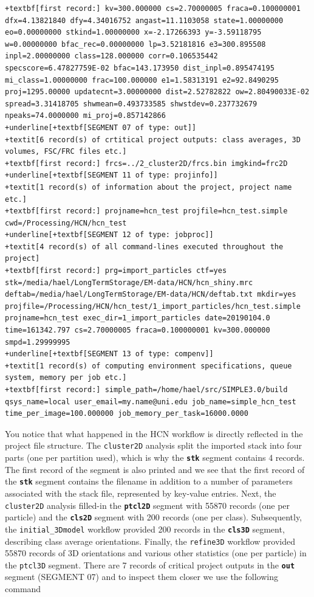 \documentclass[a4paper,11pt]{article}
\newcommand{\prgname}[1]{\textcolor{NavyBlue}{\texttt{#1}}}
\begin{document}
\begin{Verbatim}[commandchars=+\[\],fontsize=\small,breaklines=true]
+textbf[first record:] kv=300.000000 cs=2.70000005 fraca=0.100000001 dfx=4.13821840 dfy=4.34016752 angast=11.1103058 state=1.00000000 eo=0.00000000 stkind=1.00000000 x=-2.17266393 y=-3.59118795 w=0.00000000 bfac_rec=0.00000000 lp=3.52181816 e3=300.895508 inpl=2.00000000 class=128.000000 corr=0.106535442 specscore=6.47827759E-02 bfac=143.173950 dist_inpl=0.895474195 mi_class=1.00000000 frac=100.000000 e1=1.58313191 e2=92.8490295 proj=1295.00000 updatecnt=3.00000000 dist=2.52782822 ow=2.80490033E-02 spread=3.31418705 shwmean=0.493733585 shwstdev=0.237732679 npeaks=74.0000000 mi_proj=0.857142866
+underline[+textbf[SEGMENT 07 of type: out]]
+textit[6 record(s) of crtitical project outputs: class averages, 3D volumes, FSC/FRC files etc.]
+textbf[first record:] frcs=../2_cluster2D/frcs.bin imgkind=frc2D
+underline[+textbf[SEGMENT 11 of type: projinfo]]
+textit[1 record(s) of information about the project, project name etc.]
+textbf[first record:] projname=hcn_test projfile=hcn_test.simple cwd=/Processing/HCN/hcn_test
+underline[+textbf[SEGMENT 12 of type: jobproc]]
+textit[4 record(s) of all command-lines executed throughout the project]
+textbf[first record:] prg=import_particles ctf=yes stk=/media/hael/LongTermStorage/EM-data/HCN/hcn_shiny.mrc deftab=/media/hael/LongTermStorage/EM-data/HCN/deftab.txt mkdir=yes projfile=/Processing/HCN/hcn_test/1_import_particles/hcn_test.simple projname=hcn_test exec_dir=1_import_particles date=20190104.0 time=161342.797 cs=2.70000005 fraca=0.100000001 kv=300.000000 smpd=1.29999995
+underline[+textbf[SEGMENT 13 of type: compenv]]
+textit[1 record(s) of computing environment specifications, queue system, memory per job etc.]
+textbf[first record:] simple_path=/home/hael/src/SIMPLE3.0/build qsys_name=local user_email=my.name@uni.edu job_name=simple_hcn_test time_per_image=100.000000 job_memory_per_task=16000.0000
\end{Verbatim}

\noindent{}You notice that what happened in the HCN workflow is directly reflected in the project file structure. The \prgname{cluster2D} analysis split the imported stack into four parts (one per partition used), which is why the \texttt{\textbf{stk}} segment contains 4 records. The first record of the segment is also printed and we see that the first record of the \texttt{\textbf{stk}} segment contains the filename in addition to a number of parameters associated with the stack file, represented by key-value entries. Next, the \prgname{cluster2D} analysis filled-in the \texttt{\textbf{ptcl2D}} segment with 55870 records (one per particle) and the \texttt{\textbf{cls2D}} segment with 200 records (one per class). Subsequently, the \prgname{initial\_3Dmodel} workflow provided 200 records in the \texttt{\textbf{cls3D}} segment, describing class average orientations. Finally, the  \prgname{refine3D} workflow provided 55870 records of 3D orientations and various other statistics (one per particle) in the \prgname{ptcl3D} segment. There are 7 records of critical project outputs in the \texttt{\textbf{out}} segment (SEGMENT 07) and to inspect them closer we use the following command
\end{document}

